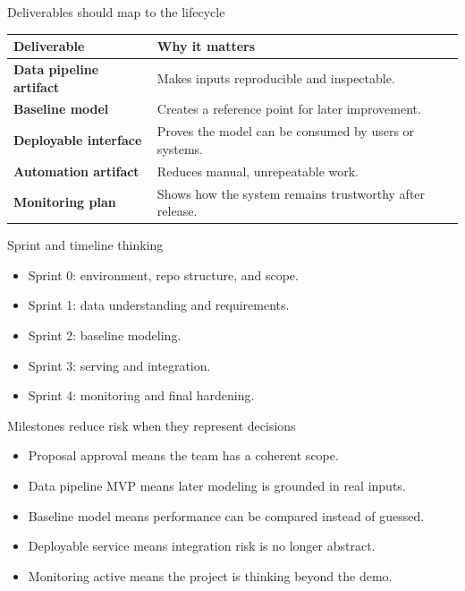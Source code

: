 \begin{frame}{Deliverables should map to the lifecycle}
\begin{tabularx}{\textwidth}{>{\bfseries}l X}
Deliverable & Why it matters \\
\toprule
Data pipeline artifact & Makes inputs reproducible and inspectable. \\
Baseline model & Creates a reference point for later improvement. \\
Deployable interface & Proves the model can be consumed by users or systems. \\
Automation artifact & Reduces manual, unrepeatable work. \\
Monitoring plan & Shows how the system remains trustworthy after release. \\
\bottomrule
\end{tabularx}
\coursefooter
\end{frame}

\begin{frame}{Sprint and timeline thinking}
\begin{itemize}
\item Sprint 0: environment, repo structure, and scope.
\item Sprint 1: data understanding and requirements.
\item Sprint 2: baseline modeling.
\item Sprint 3: serving and integration.
\item Sprint 4: monitoring and final hardening.
\end{itemize}
\coursefooter
\end{frame}

\begin{frame}{Milestones reduce risk when they represent decisions}
\begin{itemize}
\item Proposal approval means the team has a coherent scope.
\item Data pipeline MVP means later modeling is grounded in real inputs.
\item Baseline model means performance can be compared instead of guessed.
\item Deployable service means integration risk is no longer abstract.
\item Monitoring active means the project is thinking beyond the demo.
\end{itemize}
\coursefooter
\end{frame}

